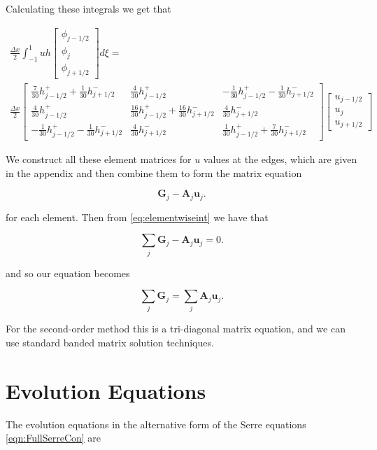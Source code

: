 Calculating these integrals we get that

\begin{multline}
\frac{\Delta x}{2}\int_{-1 }^{1}  uh \begin{bmatrix}
\phi_{j-1/2}\\\phi_j \\\phi_{j+1/2}
\end{bmatrix} d\xi =  \\  \frac{\Delta x}{2} \begin{bmatrix}
\frac{7}{30 } h^+_{j-1/2} + \frac{1}{30} h^-_{j+1/2} & \frac{4}{30 } h^+_{j-1/2}   & -\frac{1}{30 } h^+_{j-1/2} - \frac{1}{30} h^-_{j+1/2}\\\frac{4}{30 } h^+_{j-1/2} & \frac{16}{30 } h^+_{j-1/2} + \frac{16}{30} h^-_{j+1/2}&  \frac{4}{30} h^-_{j+1/2}\\ -\frac{1}{30 } h^+_{j-1/2} - \frac{1}{30} h^-_{j+1/2} &  \frac{4}{30 } h^-_{j+1/2} & \frac{1}{30 } h^+_{j-1/2} + \frac{7}{30} h^-_{j+1/2}
\end{bmatrix}  \begin{bmatrix}
u_{j-1/2}\\u_j \\u _{j+1/2}
\end{bmatrix}
\end{multline}

We construct all these element matrices for $u$ values at the edges, which are given in the appendix and then combine them to form the matrix equation

\begin{equation*}
\boldsymbol{G}_j - \boldsymbol{A}_j
\boldsymbol{u}_j.
\end{equation*}

for each element. Then from \eqref{eq:elementwiseint} we have that

\begin{equation*}
\sum_j \boldsymbol{G}_j - \boldsymbol{A}_j
\boldsymbol{u}_j = 0.
\end{equation*}

and so our equation becomes

\begin{equation*}
\sum_j \boldsymbol{G}_j = \sum_j \boldsymbol{A}_j
\boldsymbol{u}_j.
\end{equation*}

For the second-order method this is a tri-diagonal matrix equation, and we can use standard banded matrix solution techniques.

\section{Evolution Equations}
The evolution equations in the alternative form of the Serre equations \eqref{eqn:FullSerreCon} are

